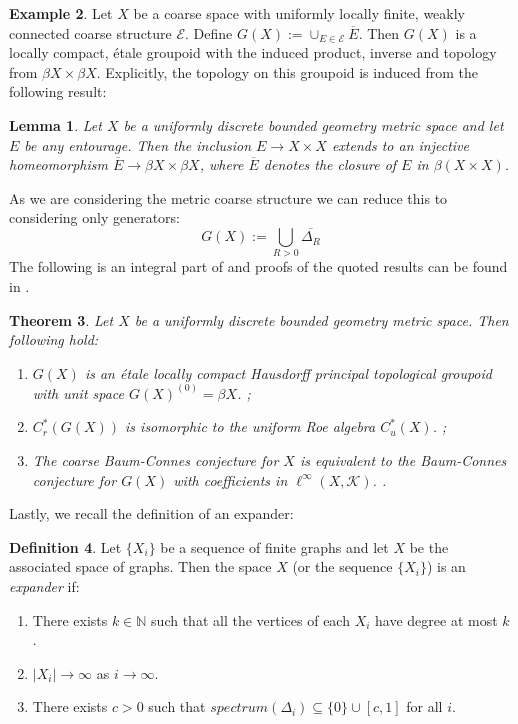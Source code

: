 \documentclass[11pt]{amsart}
\theoremstyle{plain}
\newtheorem{theorem}{Theorem}%
\newtheorem{lemma}[theorem]{Lemma}%
\theoremstyle{definition}%
\newtheorem{definition}[theorem]{Definition}%
\newtheorem{example}[theorem]{Example}%
\theoremstyle{remark}%
\begin{document}
\begin{example}Let $X$ be a coarse space with uniformly locally finite, weakly connected coarse structure $\mathcal{E}$. Define $G(X):=\cup_{E\in \mathcal{E}}\overline{E}.$ Then $G(X)$ is a locally compact, \'etale groupoid with the induced product, inverse and topology from $\beta X \times \beta X$. Explicitly, the topology on this groupoid is induced from the following result:
\begin{lemma}\label{Lem:CorRoe}\cite[Corollary 10.18]{MR2007488}
Let $X$ be a uniformly discrete bounded geometry metric space and let $E$ be any entourage. Then the inclusion $E \rightarrow X \times X$ extends to an injective homeomorphism $\overline{E} \rightarrow \beta X \times \beta X$, where $\overline{E}$ denotes the closure of $E$ in $\beta(X \times X)$.
\end{lemma}
\end{example}
As we are considering the metric coarse structure we can reduce this to considering only generators:
\begin{equation*}
G(X):=\bigcup_{R>0}\overline{\Delta_{R}}
\end{equation*}
The following is an integral part of \cite{MR1905840} and proofs of the quoted results can be found in \cite{MR2007488}.
\begin{theorem}
Let $X$ be a uniformly discrete bounded geometry metric space. Then following hold:
\begin{enumerate}
\item $G(X)$ is an \'etale locally compact Hausdorff principal topological groupoid with unit space $G(X)^{(0)}=\beta X$. \cite[Theorem 10.20]{MR2007488}\cite[Proposition 3.2]{MR1905840};
\item $C^{*}_{r}(G(X))$ is isomorphic to the uniform Roe algebra $C^{*}_{u}(X)$. \cite[Proposition 10.29]{MR2007488};
\item The coarse Baum-Connes conjecture for $X$ is equivalent to the Baum-Connes conjecture for $G(X)$ with coefficients in $\ell^{\infty}(X,\mathcal{K})$. \cite[Lemma 4.7]{MR1905840}.
\end{enumerate}
\end{theorem}

Lastly, we recall the definition of an expander:

\begin{definition}
Let $\lbrace X_{i} \rbrace$ be a sequence of finite graphs and let $X$ be the associated space of graphs. Then the space $X$ (or the sequence $\lbrace X_{i} \rbrace$) is an \textit{expander} if:
\begin{enumerate}
\item There exists $k\in \mathbb{N}$ such that all the vertices of each $X_{i}$ have degree at most $k$.
\item $\vert X_{i} \vert \rightarrow \infty$ as $i\rightarrow \infty$.
\item There exists $c>0$ such that $spectrum(\Delta_{i})\subseteq \lbrace 0 \rbrace \cup [c,1]$ for all $i$.
\end{enumerate}
\end{definition}
\end{document}
